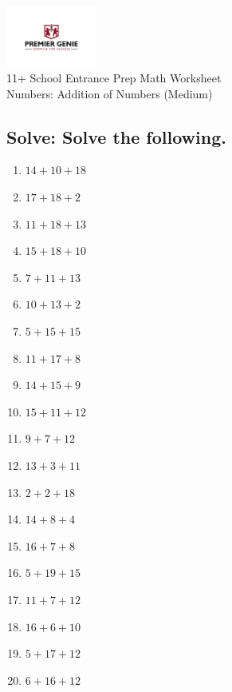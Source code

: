 \documentclass{article}
\begin{document}
\begin{center}
\includegraphics[width=3cm]{PREMGENIEJPG.jpg}\\
{\Large 11+ School Entrance Prep Math Worksheet}\\
{\Medium Numbers: Addition of Numbers (Medium)}\\

\end{center}

\subsection*{Solve: Solve the following.}

\begin{enumerate}
\item $\displaystyle {14}+{10}+{18} $ \ 
\item $\displaystyle {17}+{18}+{2} $ \ 
\item $\displaystyle {11}+{18}+{13} $ \ 
\item $\displaystyle {15}+{18}+{10} $ \ 
\item $\displaystyle {7}+{11}+{13} $ \ 
\item $\displaystyle {10}+{13}+{2} $ \ 
\item $\displaystyle {5}+{15}+{15} $ \ 
\item $\displaystyle {11}+{17}+{8} $ \ 
\item $\displaystyle {14}+{15}+{9} $ \ 
\item $\displaystyle {15}+{11}+{12} $ \ 
\item $\displaystyle {9}+{7}+{12} $ \ 
\item $\displaystyle {13}+{3}+{11} $ \ 
\item $\displaystyle {2}+{2}+{18} $ \ 
\item $\displaystyle {14}+{8}+{4} $ \ 
\item $\displaystyle {16}+{7}+{8} $ \ 
\item $\displaystyle {5}+{19}+{15} $ \ 
\item $\displaystyle {11}+{7}+{12} $ \ 
\item $\displaystyle {16}+{6}+{10} $ \ 
\item $\displaystyle {5}+{17}+{12} $ \ 
\item $\displaystyle {6}+{16}+{12} $ \ 


\end{enumerate}
\end{document}
